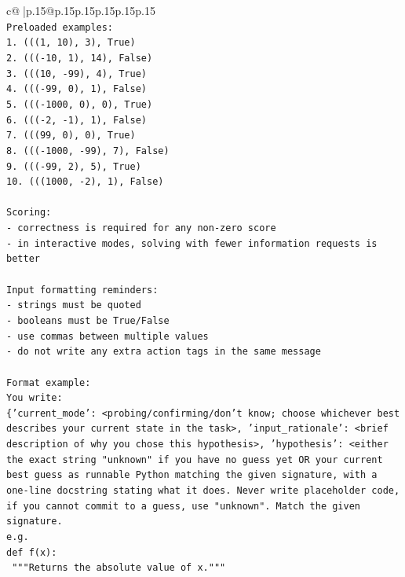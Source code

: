\documentclass{article}
\begin{document}
{\begin{supertabular}{c@{$\;$}|p{.15\linewidth}@{}p{.15\linewidth}p{.15\linewidth}p{.15\linewidth}p{.15\linewidth}p{.15\linewidth}}
{{{\\ 
\texttt{Preloaded examples:} \\
\texttt{1. (((1, 10), 3), True)} \\
\texttt{2. ((({-}10, 1), 14), False)} \\
\texttt{3. (((10, {-}99), 4), True)} \\
\texttt{4. ((({-}99, 0), 1), False)} \\
\texttt{5. ((({-}1000, 0), 0), True)} \\
\texttt{6. ((({-}2, {-}1), 1), False)} \\
\texttt{7. (((99, 0), 0), True)} \\
\texttt{8. ((({-}1000, {-}99), 7), False)} \\
\texttt{9. ((({-}99, 2), 5), True)} \\
\texttt{10. (((1000, {-}2), 1), False)} \\
\\ 
\texttt{Scoring:} \\
\texttt{{-} correctness is required for any non{-}zero score} \\
\texttt{{-} in interactive modes, solving with fewer information requests is better} \\
\\ 
\texttt{Input formatting reminders:} \\
\texttt{{-} strings must be quoted} \\
\texttt{{-} booleans must be True/False} \\
\texttt{{-} use commas between multiple values} \\
\texttt{{-} do not write any extra action tags in the same message} \\
\\ 
\texttt{Format example:} \\
\texttt{You write:} \\
\texttt{\{'current\_mode': <probing/confirming/don't know; choose whichever best describes your current state in the task>, 'input\_rationale': <brief description of why you chose this hypothesis>, 'hypothesis': <either the exact string "unknown" if you have no guess yet OR your current best guess as runnable Python matching the given signature, with a one{-}line docstring stating what it does. Never write placeholder code, if you cannot commit to a guess, use "unknown". Match the given signature.} \\
\texttt{e.g.} \\
\texttt{def f(x):} \\
\texttt{	"""Returns the absolute value of x."""} \\
}}}
\end{supertabular}}
\end{document}
